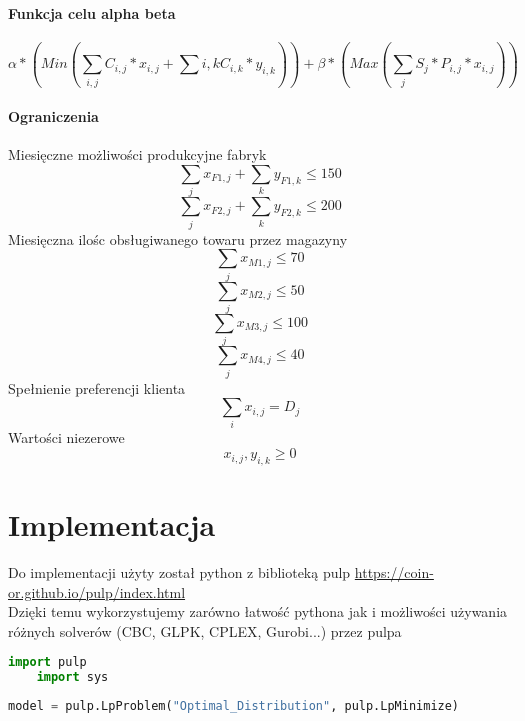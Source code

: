 \documentclass[12pt]{article}
\begin{document}
\paragraph{Funkcja celu alpha beta}
\[ \alpha * (Min(\sum_{i, j} C_{i, j} * x_{i, j} + \sum{i, k} C_{i, k} * y_{i, k})) + \beta * (Max(\sum_{j} S_j * P_{i,j} * x_{i, j}))  \]
\paragraph{Ograniczenia}
Miesięczne możliwości produkcyjne fabryk
\begin{equation}
    \sum_j x_{F1, j} + \sum_k y_{F1, k} \leq 150
\end{equation}
\begin{equation}
    \sum_j x_{F2, j} + \sum_k y_{F2, k} \leq 200
\end{equation}
Miesięczna ilośc obsługiwanego towaru przez magazyny 
\begin{equation}
    \sum_j x_{M1, j} \leq 70
\end{equation}
\begin{equation}
    \sum_j x_{M2, j} \leq 50
\end{equation}
\begin{equation}
    \sum_j x_{M3, j} \leq 100
\end{equation}
\begin{equation}
    \sum_j x_{M4, j} \leq 40
\end{equation}
Spełnienie preferencji klienta 
\begin{equation}
    \sum_i x_{i, j} = D_j
\end{equation}
Wartości niezerowe 
\begin{equation}
    x_{i, j}, y_{i, k} \geq 0
\end{equation}

\section{Implementacja}
Do implementacji użyty został python z biblioteką pulp \href{https://coin-or.github.io/pulp/index.html}{https://coin-or.github.io/pulp/index.html} \\ 
Dzięki temu wykorzystujemy zarówno łatwość pythona jak i możliwości używania różnych solverów (CBC, GLPK, CPLEX, Gurobi...) przez pulpa \\ 
\begin{lstlisting}[language=Python, caption={Import bilbioteki pulp i bibliotek używanych do wykresu}]
    import pulp
    import sys
\end{lstlisting}
\begin{lstlisting}[language=Python, caption={Iniicjalizacja modelu}]
    model = pulp.LpProblem("Optimal_Distribution", pulp.LpMinimize)
\end{lstlisting}
\end{document}
